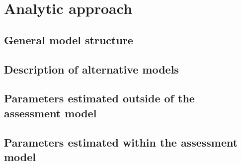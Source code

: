 \documentclass[11pt,
  english,
  a4paper,
]{article}
\begin{document}
\leavevmode\tagmcend\tagstructend


\hypertarget{analytic-approach}{%
\section{Analytic approach}\label{analytic-approach}}

\leavevmode\tagmcend\tagstructend


\hypertarget{general-model-structure}{%
\subsection{General model structure}\label{general-model-structure}}

\leavevmode\tagmcend\tagstructend


\hypertarget{description-of-alternative-models}{%
\subsection{Description of alternative models}\label{description-of-alternative-models}}

\leavevmode\tagmcend\tagstructend


\hypertarget{parameters-estimated-outside-of-the-assessment-model}{%
\subsection{Parameters estimated outside of the assessment model}\label{parameters-estimated-outside-of-the-assessment-model}}

\leavevmode\tagmcend\tagstructend


\hypertarget{parameters-estimated-within-the-assessment-model}{%
\subsection{Parameters estimated within the assessment model}\label{parameters-estimated-within-the-assessment-model}}

\leavevmode\tagmcend\tagstructend

\end{document}
